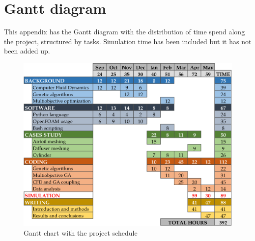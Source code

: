 \chapter{Gantt diagram}

This appendix has the Gantt diagram with the distribution of time spend along the project, structured by tasks. Simulation time has been included but it has not been added up.
    
    \begin{figure}[h!]
        \centering
        \includegraphics[width=1\textwidth]{Figures/others/GanttDiagram.pdf} 
        \caption{Gantt chart with the project schedule}
        \label{fig:Gantt}
    \end{figure}    
